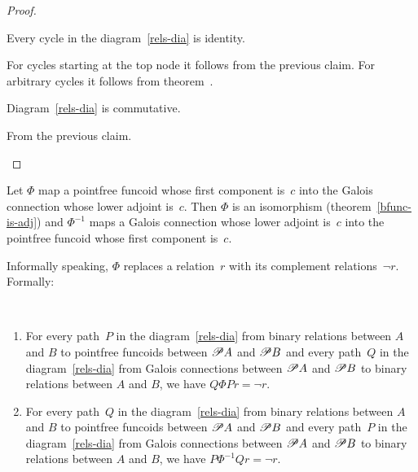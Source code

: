 \begin{proof}
\begin{claim}
Every cycle in the diagram~\ref{rels-dia} is identity.
\end{claim}
\begin{claimproof}
For cycles starting at the top node it follows from the previous claim.
For arbitrary cycles it follows from theorem~.
\end{claimproof}

\begin{claim}
Diagram~\ref{rels-dia} is commutative.
\end{claim}
\begin{claimproof}
From the previous claim.
\end{claimproof}

\end{proof}

Let $\Phi$ map a pointfree funcoid whose first component is~$c$ into the Galois connection whose lower adjoint is~$c$.
Then $\Phi$ is an isomorphism (theorem~\ref{bfunc-is-adj}) and
$\Phi^{-1}$ maps a Galois connection whose lower adjoint is~$c$ into the pointfree funcoid whose first component is~$c$.

Informally speaking, $\Phi$ replaces a relation~$r$ with its complement relations~$\lnot r$. Formally:

\begin{prop}
~
\begin{enumerate}
\item For every path~$P$ in the diagram~\ref{rels-dia} from binary relations between $A$ and $B$
to pointfree funcoids between $\mathscr{P} A$ and $\mathscr{P} B$
and every path~$Q$ in the diagram~\ref{rels-dia} from
Galois connections between $\mathscr{P} A$ and $\mathscr{P} B$
to binary relations between $A$ and $B$,
we have $Q\Phi P r = \lnot r$.

\item For every path~$Q$ in the diagram~\ref{rels-dia} from binary relations between $A$ and $B$
to pointfree funcoids between $\mathscr{P} A$ and $\mathscr{P} B$
and every path~$P$ in the diagram~\ref{rels-dia}
from Galois connections between $\mathscr{P} A$ and $\mathscr{P} B$
to binary relations between $A$ and $B$,
we have $P\Phi^{-1} Q r = \lnot r$.
\end{enumerate}
\end{prop}


